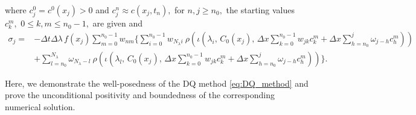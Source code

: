 \documentclass[a4paper, UKenglish, numberwithinsect, thm-restate]{tgdk-v2021}
\begin{document}
where $c_j^0=c^0(x_j)>0$ and $c_j^n\approx c(x_j,t_n),$ for $n,j\geq n_0,$ the starting values $c_k^m,$ $0\leq k,m\leq n_0-1,$  are given and 
\begin{equation*}
    \begin{split}
        \sigma_j=&-\Delta t \Delta \lambda \, f(x_j)\sum_{m=0}^{n_0-1} w_{nm} \Bigg\{\sum_{i=0}^{n_0-1}w_{N_\lambda i} \ \rho\left( \! \iota \! \left(\lambda_i,\, C_0(x_j) ,\, \Delta x \sum_{k=0}^{n_0-1}w_{jk}c_k^m+\Delta x\sum_{h=n_0}^{j}\omega_{j-h}c_h^m\right)\!\right) \\ &+\sum_{l=n_0}^{N_\lambda}\omega_{N_\lambda-l} \ \rho\left( \! \iota \! \left(\lambda_l,\, C_0(x_j) ,\, \Delta x \sum_{k=0}^{n_0-1}w_{jk}c_k^m+\Delta x\sum_{h=n_0}^{j}\omega_{j-h}c_h^m\right)\!\right) \Bigg\}. %
    \end{split}
\end{equation*}

Here, we demonstrate the well-posedness of the DQ method \eqref{eq:DQ_method}
and prove the unconditional positivity and boundedness of the corresponding numerical solution.
\end{document}
